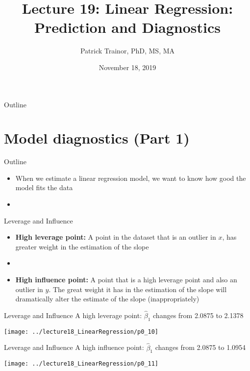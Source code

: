 \documentclass[xcolor=dvipsnames]{beamer}
\title[Lecture 19]{Lecture 19: Linear Regression: Prediction and Diagnostics}
\author[Patrick Trainor]{Patrick Trainor, PhD, MS, MA}
\institute[NMSU]{New Mexico State University}
\date{November 18, 2019}
\begin{document}
\begin{frame}
\maketitle
\end{frame}

\begin{frame}{Outline}
\tableofcontents[hideallsubsections]
\end{frame}

\section{Model diagnostics (Part 1)}
\begin{frame}{Outline}
\tableofcontents[currentsection,subsectionstyle=show/shaded/hide]
\end{frame}

\begin{frame}
	\begin{itemize}
		\item When we estimate a linear regression model, we want to know how good the model fits the data
		\item[]
	\end{itemize}
\end{frame}

\begin{frame}{Leverage and Influence}
	\begin{itemize}
		\item \textbf{High leverage point:} A point in the dataset that is an outlier in $x$, has greater weight in the estimation of the slope \pause
		\item[]
		\item \textbf{High influence point:} A point that is a high leverage point and also an outlier in $y$. The great weight it has in the estimation of the slope will dramatically alter the estimate of the slope (inappropriately)
	\end{itemize}
\end{frame}

\begin{frame}{Leverage and Influence}
A high leverage point: $\hat{\beta}_1$ changes from 2.0875 to 2.1378
	\begin{center}
		\texttt{[image: ../lecture18\_LinearRegression/p0\_10]}
	\end{center}
\end{frame}

\begin{frame}{Leverage and Influence}
A high influence point: $\hat{\beta}_1$ changes from 2.0875 to 1.0954
\begin{center}
	\texttt{[image: ../lecture18\_LinearRegression/p0\_11]}
\end{center}
\end{frame}
\end{document}
